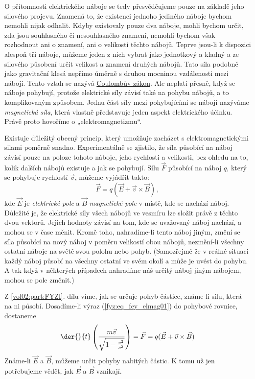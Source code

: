     O přítomnosti elektrického náboje se tedy přesvědčujeme pouze na základě jeho silového projevu.
    Znamená to, že existenci jednoho jediného náboje bychom nemohli nijak odhalit. Kdyby
    existovaly pouze dva náboje, mohli bychom určit, zda jsou souhlasného či nesouhlasného
    znamení, nemohli bychom však rozhodnout ani o znamení, ani o velikosti těchto nábojů. Teprve
    jsou-li k dispozici alespoň tři náboje, můžeme jeden z nich vybrat jako jednotkový a kladný a
    ze silového působení určit velikost a znamení druhých nábojů. Tato síla podobně jako gravitační 
    klesá nepřímo úměrně s druhou mocninou vzdálenosti mezi náboji. Tento vztah se nazývá 
    \hyperlink{fyz:IIchapIVsecII}{Coulombův zákon}. Ale neplatí přesně, když se náboje pohybují, 
    protože elektrické síly závisí také na pohybu nábojů, a to komplikovaným způsobem. Jednu část 
    síly mezi pohybujícími se náboji nazýváme \emph{magnetická síla}, která vlastně představuje 
    jeden aspekt elektrického účinku. Právě proto hovoříme o „elektromagnetizmu“.
    
    Existuje důležitý obecný princip, který umožňuje zacházet s elektromagnetickými silami poměrně 
    snadno. Experimentálně se zjistilo, že síla působící na náboj závisí pouze na poloze tohoto 
    náboje, jeho rychlosti a velikosti, bez ohledu na to, kolik dalších nábojů existuje a jak se 
    pohybují. Sílu \(\vec{F}\) působící na náboj \(q\), který se pohybuje rychlostí \(\vec{v}\), 
    můžeme vyjádřit takto:
    \begin{equation}\label{fyz:eq_fey_elmag01}
      \boxed{\vec{F} = q(\vec{E}+\vec{v}\times\vec{B})}\, ,
    \end{equation}
    kde \(\vec{E}\) je \emph{elektrické pole} a \(\vec{B}\) \emph{magnetické pole} v místě, kde se 
    nachází náboj. Důležité je, že elektrické síly všech nábojů ve vesmíru lze složit právě z 
    těchto dvou vektorů. Jejich hodnoty závisí na tom, kde se uvažovaný náboj nachází, a mohou se v 
    čase měnit. Kromě toho, nahradíme-li tento náboj jiným, změní se síla působící na nový náboj v 
    poměru velikostí obou nábojů, nezmění-li všechny ostatní náboje na světě svou polohu nebo 
    pohyb. (Samozřejmě že v reálné situaci každý náboj působí na všechny ostatní ve svém okolí a 
    může je uvést do pohybu. A tak když v některých případech nahradíme náš určitý náboj jiným 
    nábojem, mohou se pole změnit.)
    
    Z \ref{vol02:part:FYZI}. dílu víme, jak se určuje pohyb částice, známe-li sílu, která na ni
    působí. Dosadíme-li výraz (\ref{fyz:eq_fey_elmag01}) do pohybové rovnice, dostaneme
    \begin{equation}\label{fyz:eq_fey_elmag02}
      \der{ }{t}\left(\frac{m\vec{v}}{\sqrt{1-\frac{v^2}{c^2}}}\right) = \vec{F} =
      q(\vec{E}+\vec{v}\times\vec{B})
    \end{equation}
    Známe-li \(\vec{E}\) a \(\vec{B}\), můžeme určit pohyby nabitých částic. K tomu už jen 
    potřebujeme vědět, jak \(\vec{E}\) a \(\vec{B}\) vznikají.
    
